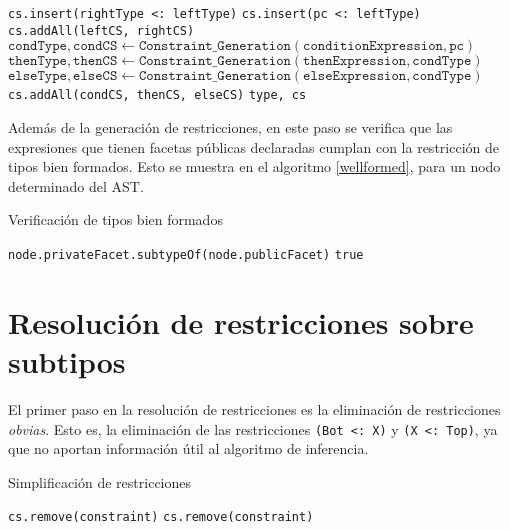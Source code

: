 \begin{algorithm}
\begin{algorithmic}[1]
              \State \texttt{cs.insert(rightType <: leftType)}
              \State \texttt{cs.insert(pc <: leftType)}
              \State \texttt{cs.addAll(leftCS, rightCS)}
            \EndCase
              \State $\mathtt{condType, condCS\gets Constraint\_Generation(conditionExpression, pc)}$
              \State $\mathtt{thenType, thenCS\gets Constraint\_Generation(thenExpression, condType)}$
              \State $\mathtt{elseType, elseCS\gets Constraint\_Generation(elseExpression, condType)}$
              \State \texttt{cs.addAll(condCS, thenCS, elseCS)}
            \EndCase
          \EndSwitch
          \State \Return \texttt{type, cs}
      \EndFunction
    \end{algorithmic}
\end{algorithm}

Además de la generación de restricciones, en este paso se verifica que las expresiones que tienen facetas públicas declaradas cumplan con la restricción de tipos bien formados. Esto se muestra en el algoritmo \ref{wellformed}, para un nodo determinado del AST.
\clearpage
\begin{algorithm}\captionsetup{labelsep=newline}
  \centering
  \caption{Verificación de tipos bien formados}
  \label{wellformed}
    \begin{algorithmic}[1]
            \State \Return \texttt{node.privateFacet.subtypeOf(node.publicFacet)}
          \EndIf
          \State \Return \texttt{true}
      \EndFunction
    \end{algorithmic}
\end{algorithm}

\section{Resolución de restricciones sobre subtipos} \label{propuestaRes}

El primer paso en la resolución de restricciones es la eliminación de restricciones \textit{obvias}. Esto es, la eliminación de las restricciones \texttt{(Bot <: X)} y \texttt{(X <: Top)}, ya que no aportan información útil al algoritmo de inferencia.

\begin{algorithm}\captionsetup{labelsep=newline}
  \centering
  \caption{Simplificación de restricciones}
  \label{pseudosimplify}
    \begin{algorithmic}[1]
              \State \texttt{cs.remove(constraint)}
              \State \texttt{cs.remove(constraint)}
            \EndIf
          \EndFor
      \EndFunction
    \end{algorithmic}
\end{algorithm}

